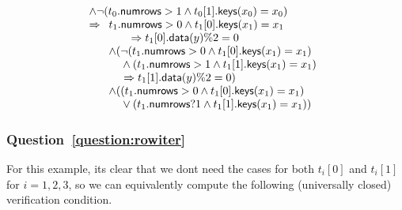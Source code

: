 \documentclass{article}
\newcommand{\NumRows}{\mathsf{numrows}}
\newcommand{\MatchRow}{\mathsf{keys}}
\newcommand{\ActionDataRow}{\mathsf{data}}
\begin{document}
\[\begin{array}{l}
  \wedge \neg (t_0.\NumRows > 1 \wedge t_0[1].\MatchRow(x_0) = x_0 ) \\
  \Rightarrow
  \begin{array}[t]{l}
    t_1.\NumRows > 0 \wedge t_1[0].\MatchRow(x_1) = x_1 \\
    \qquad \Rightarrow t_1[0].\ActionDataRow(y) \% 2 = 0 \\
    \wedge (\neg (t_1.\NumRows > 0 \wedge t_1[0].\MatchRow(x_1) = x_1) \\
    \phantom{\wedge(}\wedge (t_1.\NumRows > 1 \wedge t_1[1].\MatchRow(x_1) = x_1) \\
    \phantom{\wedge(}\Rightarrow t_1[1].\ActionDataRow(y) \% 2 = 0 )\\
    \wedge ((t_1.\NumRows > 0 \wedge t_1[0].\MatchRow(x_1) = x_1) \\
    \phantom{\wedge (}\vee (t_1.\NumRows ? 1 \wedge t_1[1].\MatchRow(x_1) = x_1)) \\
    \end{array}
\end{array}
\]

\subsubsection{Question~\ref{question:rowiter}}

For this example, its clear that we dont need the cases for both \(t_i[0]\) and
\(t_i[1]\) for $i = 1,2,3$, so we can equivalently compute the following
(universally closed) verification condition.
\end{document}
